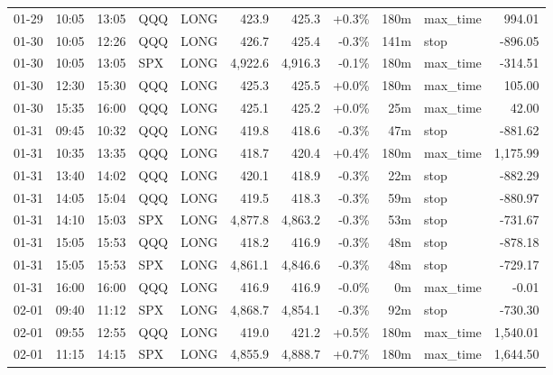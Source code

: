 \documentclass[11pt,a4paper,twoside]{article}
\begin{document}
\begin{center}
\begin{longtable}{>{\color{txtmain}}l l l l l r r r r >{\color{txtmain}}l r}
01-29 & 10:05 & 13:05 & QQQ & LONG & 423.9 & 425.3 & \textcolor{wingreen}{+0.3\%} & 180m & max\_time & \textcolor{wingreen}{994.01} \\
01-30 & 10:05 & 12:26 & QQQ & LONG & 426.7 & 425.4 & \textcolor{lossred}{-0.3\%} & 141m & stop & \textcolor{lossred}{-896.05} \\
01-30 & 10:05 & 13:05 & SPX & LONG & 4,922.6 & 4,916.3 & \textcolor{lossred}{-0.1\%} & 180m & max\_time & \textcolor{lossred}{-314.51} \\
01-30 & 12:30 & 15:30 & QQQ & LONG & 425.3 & 425.5 & \textcolor{wingreen}{+0.0\%} & 180m & max\_time & \textcolor{wingreen}{105.00} \\
01-30 & 15:35 & 16:00 & QQQ & LONG & 425.1 & 425.2 & \textcolor{wingreen}{+0.0\%} & 25m & max\_time & \textcolor{wingreen}{42.00} \\
01-31 & 09:45 & 10:32 & QQQ & LONG & 419.8 & 418.6 & \textcolor{lossred}{-0.3\%} & 47m & stop & \textcolor{lossred}{-881.62} \\
01-31 & 10:35 & 13:35 & QQQ & LONG & 418.7 & 420.4 & \textcolor{wingreen}{+0.4\%} & 180m & max\_time & \textcolor{wingreen}{1,175.99} \\
01-31 & 13:40 & 14:02 & QQQ & LONG & 420.1 & 418.9 & \textcolor{lossred}{-0.3\%} & 22m & stop & \textcolor{lossred}{-882.29} \\
01-31 & 14:05 & 15:04 & QQQ & LONG & 419.5 & 418.3 & \textcolor{lossred}{-0.3\%} & 59m & stop & \textcolor{lossred}{-880.97} \\
01-31 & 14:10 & 15:03 & SPX & LONG & 4,877.8 & 4,863.2 & \textcolor{lossred}{-0.3\%} & 53m & stop & \textcolor{lossred}{-731.67} \\
01-31 & 15:05 & 15:53 & QQQ & LONG & 418.2 & 416.9 & \textcolor{lossred}{-0.3\%} & 48m & stop & \textcolor{lossred}{-878.18} \\
01-31 & 15:05 & 15:53 & SPX & LONG & 4,861.1 & 4,846.6 & \textcolor{lossred}{-0.3\%} & 48m & stop & \textcolor{lossred}{-729.17} \\
01-31 & 16:00 & 16:00 & QQQ & LONG & 416.9 & 416.9 & \textcolor{lossred}{-0.0\%} & 0m & max\_time & \textcolor{lossred}{-0.01} \\
02-01 & 09:40 & 11:12 & SPX & LONG & 4,868.7 & 4,854.1 & \textcolor{lossred}{-0.3\%} & 92m & stop & \textcolor{lossred}{-730.30} \\
02-01 & 09:55 & 12:55 & QQQ & LONG & 419.0 & 421.2 & \textcolor{wingreen}{+0.5\%} & 180m & max\_time & \textcolor{wingreen}{1,540.01} \\
02-01 & 11:15 & 14:15 & SPX & LONG & 4,855.9 & 4,888.7 & \textcolor{wingreen}{+0.7\%} & 180m & max\_time & \textcolor{wingreen}{1,644.50} \\

\end{longtable}
\end{center}
\end{document}
